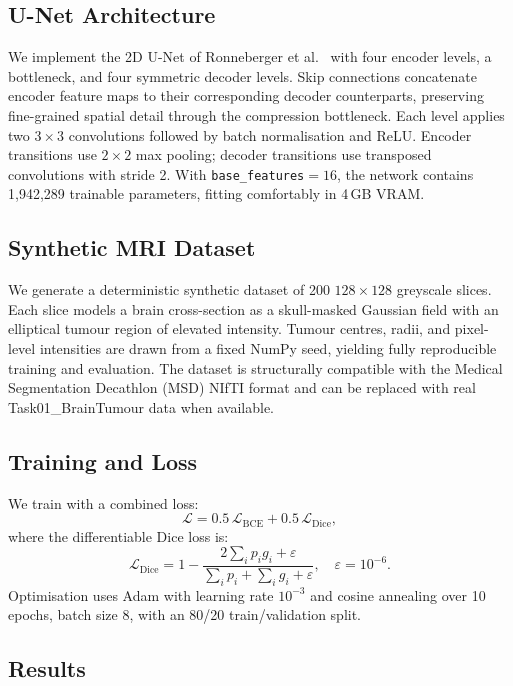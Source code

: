 \documentclass[journal]{IEEEtran}
\begin{document}
\subsection{U-Net Architecture}
We implement the 2D U-Net of Ronneberger et al.~\cite{ronneberger2015} with four encoder levels, a bottleneck, and four symmetric decoder levels. Skip connections concatenate encoder feature maps to their corresponding decoder counterparts, preserving fine-grained spatial detail through the compression bottleneck. Each level applies two $3\times 3$ convolutions followed by batch normalisation and ReLU. Encoder transitions use $2\times 2$ max pooling; decoder transitions use transposed convolutions with stride 2. With \texttt{base\_features}$=16$, the network contains 1{,}942{,}289 trainable parameters, fitting comfortably in 4\,GB VRAM.

\subsection{Synthetic MRI Dataset}
We generate a deterministic synthetic dataset of 200 $128\times 128$ greyscale slices. Each slice models a brain cross-section as a skull-masked Gaussian field with an elliptical tumour region of elevated intensity. Tumour centres, radii, and pixel-level intensities are drawn from a fixed NumPy seed, yielding fully reproducible training and evaluation. The dataset is structurally compatible with the Medical Segmentation Decathlon (MSD) NIfTI format and can be replaced with real Task01\_BrainTumour data when available.

\subsection{Training and Loss}
We train with a combined loss:
\begin{equation}
  \mathcal{L} = 0.5\,\mathcal{L}_{\mathrm{BCE}} + 0.5\,\mathcal{L}_{\mathrm{Dice}},
\end{equation}
where the differentiable Dice loss is:
\begin{equation}
  \mathcal{L}_{\mathrm{Dice}} = 1 - \frac{2\sum_i p_i g_i + \varepsilon}{\sum_i p_i + \sum_i g_i + \varepsilon},\quad \varepsilon=10^{-6}.
\end{equation}
Optimisation uses Adam with learning rate $10^{-3}$ and cosine annealing over 10 epochs, batch size 8, with an 80/20 train/validation split.

\subsection{Results}
\end{document}
